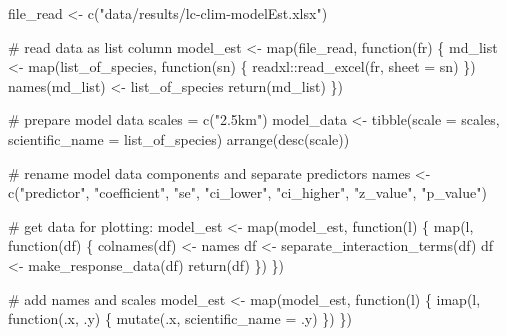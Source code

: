 \documentclass[]{article}
\newenvironment{Shaded}{}{}
\newcommand{\CommentTok}[1]{\textcolor[rgb]{0.00,0.50,0.00}{#1}}
\newcommand{\ControlFlowTok}[1]{\textcolor[rgb]{0.00,0.00,1.00}{#1}}
\newcommand{\DataTypeTok}[1]{#1}
\newcommand{\KeywordTok}[1]{\textcolor[rgb]{0.00,0.00,1.00}{#1}}
\newcommand{\NormalTok}[1]{#1}
\newcommand{\OperatorTok}[1]{#1}
\newcommand{\StringTok}[1]{\textcolor[rgb]{0.00,0.50,0.50}{#1}}
\begin{document}
\begin{Shaded}
\begin{Highlighting}[]
\NormalTok{file_read <-}\StringTok{ }\KeywordTok{c}\NormalTok{(}\StringTok{"data/results/lc-clim-modelEst.xlsx"}\NormalTok{)}

\CommentTok{# read data as list column}
\NormalTok{model_est <-}\StringTok{ }\KeywordTok{map}\NormalTok{(file_read, }\ControlFlowTok{function}\NormalTok{(fr) \{}
\NormalTok{  md_list <-}\StringTok{ }\KeywordTok{map}\NormalTok{(list_of_species, }\ControlFlowTok{function}\NormalTok{(sn) \{}
\NormalTok{    readxl}\OperatorTok{::}\KeywordTok{read_excel}\NormalTok{(fr, }\DataTypeTok{sheet =}\NormalTok{ sn)}
\NormalTok{  \})}
  \KeywordTok{names}\NormalTok{(md_list) <-}\StringTok{ }\NormalTok{list_of_species}
  \KeywordTok{return}\NormalTok{(md_list)}
\NormalTok{\})}

\CommentTok{# prepare model data}
\NormalTok{scales =}\StringTok{ }\KeywordTok{c}\NormalTok{(}\StringTok{"2.5km"}\NormalTok{)}
\NormalTok{model_data <-}\StringTok{ }\KeywordTok{tibble}\NormalTok{(}\DataTypeTok{scale =}\NormalTok{ scales, }
                              \DataTypeTok{scientific_name =}\NormalTok{ list_of_species) }\OperatorTok{%
\StringTok{  }\KeywordTok{arrange}\NormalTok{(}\KeywordTok{desc}\NormalTok{(scale))}

\CommentTok{# rename model data components and separate predictors}
\NormalTok{names <-}\StringTok{ }\KeywordTok{c}\NormalTok{(}\StringTok{"predictor"}\NormalTok{, }\StringTok{"coefficient"}\NormalTok{, }\StringTok{"se"}\NormalTok{, }\StringTok{"ci_lower"}\NormalTok{, }
           \StringTok{"ci_higher"}\NormalTok{, }\StringTok{"z_value"}\NormalTok{, }\StringTok{"p_value"}\NormalTok{)}

\CommentTok{# get data for plotting:}
\NormalTok{model_est <-}\StringTok{ }\KeywordTok{map}\NormalTok{(model_est, }\ControlFlowTok{function}\NormalTok{(l) \{}
  \KeywordTok{map}\NormalTok{(l, }\ControlFlowTok{function}\NormalTok{(df) \{}
    \KeywordTok{colnames}\NormalTok{(df) <-}\StringTok{ }\NormalTok{names}
\NormalTok{    df <-}\StringTok{ }\KeywordTok{separate_interaction_terms}\NormalTok{(df)}
\NormalTok{    df <-}\StringTok{ }\KeywordTok{make_response_data}\NormalTok{(df) }
    \KeywordTok{return}\NormalTok{(df)}
\NormalTok{  \})}
\NormalTok{\})}

\CommentTok{# add names and scales}
\NormalTok{model_est <-}\StringTok{ }\KeywordTok{map}\NormalTok{(model_est, }\ControlFlowTok{function}\NormalTok{(l) \{}
  \KeywordTok{imap}\NormalTok{(l, }\ControlFlowTok{function}\NormalTok{(.x, .y) \{}
    \KeywordTok{mutate}\NormalTok{(.x, }\DataTypeTok{scientific_name =}\NormalTok{ .y)}
\NormalTok{  \})}
\NormalTok{\})}

}
\end{Highlighting}
\end{Shaded}
\end{document}
